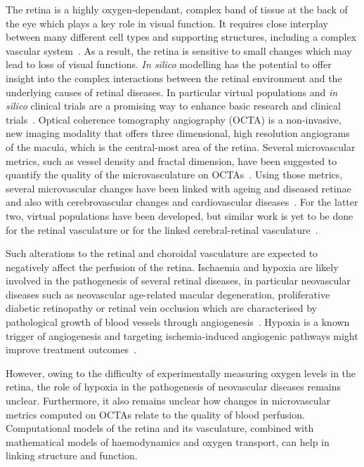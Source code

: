 \documentclass[11pt,]{article}
\begin{document}
The retina is a highly oxygen-dependant, complex band of tissue at the back of the eye which plays a key role in visual function.
It requires close interplay between many different cell types and supporting structures, including a complex vascular system~\cite{Hernandez2023}.
As a result, the retina is sensitive to small changes which may lead to loss of visual functions.
\textit{In silico} modelling has the potential to offer insight into the complex interactions between the retinal environment and the underlying causes of retinal diseases.
In particular virtual populations and \textit{in silico} clinical trials are a promising way to enhance basic research and clinical trials~\cite{Hernandez2023}.
Optical coherence tomography angiography (OCTA) is a non-invasive, new imaging modality that offers three dimensional, high resolution angiograms of the macula, which is the central-most area of the retina.
Several microvascular metrics, such as vessel density and fractal dimension, have been suggested to quantify the quality of the microvasculature on OCTAs~\cite{Chu2016}.
Using those metrics, several microvascular changes have been linked with ageing and diseased retinae\cite{Ma2021,Trinh_2019, Told2023} and also with cerebrovascular changes and cardiovascular diseases~\cite{Pleouras_2021,Graff_2021,LopezCuenca_2022}.
For the latter two, virtual populations have been developed, but similar work is yet to be done for the retinal vasculature or for the linked cerebral-retinal vasculature~\cite{Hernandez2023}.

Such alterations to the retinal and choroidal vasculature are expected to negatively affect the perfusion of the retina.
Ischaemia and hypoxia are likely involved in the pathogenesis of several retinal diseases, in
particular neovascular diseases such as neovascular age-related
macular degeneration, proliferative diabetic retinopathy or retinal
vein occlusion which are characterised by pathological growth of blood
vessels through angiogenesis~\cite{Medina_2016}.
Hypoxia is a known trigger of angiogenesis and targeting ischemia-induced angiogenic pathways might improve treatment outcomes~\cite{UsuiOuchi2020}.

However, owing to the difficulty of experimentally measuring oxygen
levels in the retina, the role of hypoxia in the pathogenesis of
neovascular diseases remains unclear. Furthermore, it also remains unclear
how changes in microvascular metrics computed on OCTAs relate to the
quality of blood perfusion. Computational models of the retina and its
vasculature, combined with mathematical models of haemodynamics and
oxygen transport, can help in linking structure and function.
\end{document}
